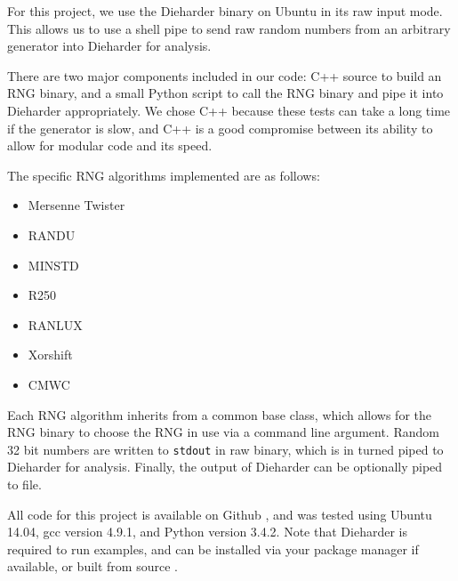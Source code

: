 For this project, we use the Dieharder binary on Ubuntu in its raw input mode. This allows us to use a shell pipe to send raw random numbers from an arbitrary generator into Dieharder for analysis.

There are two major components included in our code: C++ source to build an RNG binary, and a small Python script to call the RNG binary and pipe it into Dieharder appropriately. We chose C++ because these tests can take a long time if the generator is slow, and C++ is a good compromise between its ability to allow for modular code and its speed.

The specific RNG algorithms implemented are as follows:
\begin{itemize}
    \item Mersenne Twister
    \item RANDU
    \item MINSTD
    \item R250
    \item RANLUX
    \item Xorshift
    \item CMWC
\end{itemize}
Each RNG algorithm inherits from a common base class, which allows for the RNG binary to choose the RNG in use via a command line argument. Random 32 bit numbers are written to \texttt{stdout} in raw binary, which is in turned piped to Dieharder for analysis. Finally, the output of Dieharder can be optionally piped to file.

All code for this project is available on Github \cite{github_repo}, and was tested using Ubuntu 14.04, gcc version 4.9.1, and Python version 3.4.2. Note that Dieharder is required to run examples, and can be installed via your package manager if available, or built from source \cite{dieharder_website}.
